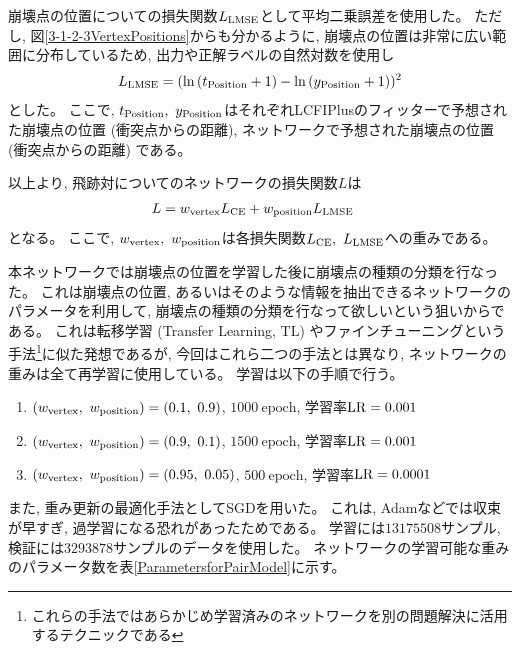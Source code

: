 崩壊点の位置についての損失関数$L_{\rm LMSE}$として平均二乗誤差を使用した。
ただし, 図\ref{3-1-2-3VertexPositions}からも分かるように, 崩壊点の位置は非常に広い範囲に分布しているため, 出力や正解ラベルの自然対数を使用し
\begin{equation}
 \begin{split}
 L_{\rm LMSE} = (\ln{(t_{\rm Position}+1)} - \ln{(y_{\rm Position}+1)})^2
 \end{split}
\end{equation}
とした。
ここで, $t_{\rm Position},\ y_{\rm Position}$はそれぞれLCFIPlusのフィッターで予想された崩壊点の位置 (衝突点からの距離), ネットワークで予想された崩壊点の位置 (衝突点からの距離) である。

以上より, 飛跡対についてのネットワークの損失関数$L$は
\begin{equation}
 \begin{split}
 L & = w_{\rm vertex} L_{\rm CE} + w_{\rm position} L_{\rm LMSE}
 \end{split}
\end{equation}
となる。
ここで, $w_{\rm vertex},\ w_{\rm position}$は各損失関数$L_{\rm CE},\ L_{\rm LMSE}$への重みである。

本ネットワークでは崩壊点の位置を学習した後に崩壊点の種類の分類を行なった。
これは崩壊点の位置, あるいはそのような情報を抽出できるネットワークのパラメータを利用して, 崩壊点の種類の分類を行なって欲しいという狙いからである。
これは転移学習 (Transfer Learning, TL) やファインチューニングという手法\footnote{これらの手法ではあらかじめ学習済みのネットワークを別の問題解決に活用するテクニックである}に似た発想であるが, 今回はこれら二つの手法とは異なり, ネットワークの重みは全て再学習に使用している。
学習は以下の手順で行う。

\begin{enumerate}
 \item $(w_{\rm vertex},\ w_{\rm position})=(0.1,\ 0.9)$, $1000\ \mathrm{epoch}$, 学習率${\rm LR}=0.001$
 \item $(w_{\rm vertex},\ w_{\rm position})=(0.9,\ 0.1)$, $1500\ \mathrm{epoch}$, 学習率${\rm LR}=0.001$
 \item $(w_{\rm vertex},\ w_{\rm position})=(0.95,\ 0.05)$, $500\ \mathrm{epoch}$, 学習率${\rm LR}=0.0001$
\end{enumerate}

また, 重み更新の最適化手法としてSGDを用いた。
これは, Adamなどでは収束が早すぎ, 過学習になる恐れがあったためである。
学習には$13175508$サンプル, 検証には$3293878$サンプルのデータを使用した。
ネットワークの学習可能な重みのパラメータ数を表\ref{ParametersforPairModel}に示す。

